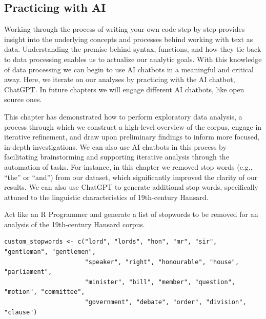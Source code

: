 \documentclass[
]{article}
\begin{document}
\subsection{Practicing with AI}\label{practicing-with-ai}

Working through the process of writing your own code step-by-step
provides insight into the underlying concepts and processes behind
working with text as data. Understanding the premise behind syntax,
functions, and how they tie back to data processing enables us to
actualize our analytic goals. With this knowledge of data processing we
can begin to use AI chatbots in a meaningful and critical away. Here, we
iterate on our analyses by practicing with the AI chatbot, ChatGPT. In
future chapters we will engage different AI chatbots, like open source
ones.

This chapter has demonstrated how to perform exploratory data analysis,
a process through which we construct a high-level overview of the
corpus, engage in iterative refinement, and draw upon preliminary
findings to inform more focused, in-depth investigations. We can also
use AI chatbots in this process by facilitating brainstorming and
supporting iterative analysis through the automation of tasks. For
instance, in this chapter we removed stop words (e.g., ``the'' or
``and'') from our dataset, which significantly improved the clarity of
our results. We can also use ChatGPT to generate additional stop words,
specifically attuned to the linguistic characteristics of 19th-century
Hansard.

\begin{tcolorbox}[colback=blue!5!white, colframe=blue!75!black, title=Analyst Prompt]
Act like an R Programmer and generate a list of stopwords to be removed for an analysis of the 19th-century Hansard corpus.
\end{tcolorbox}

\begin{tcolorbox}[colback=green!5!white, colframe=green!75!black, title=ChatGPT-4o Response]
\begin{verbatim}
custom_stopwords <- c("lord", "lords", "hon", "mr", "sir", "gentleman", "gentlemen",
                      "speaker", "right", "honourable", "house", "parliament", 
                      "minister", "bill", "member", "question", "motion", "committee", 
                      "government", "debate", "order", "division", "clause")
\end{verbatim}
\end{tcolorbox}
\end{document}
